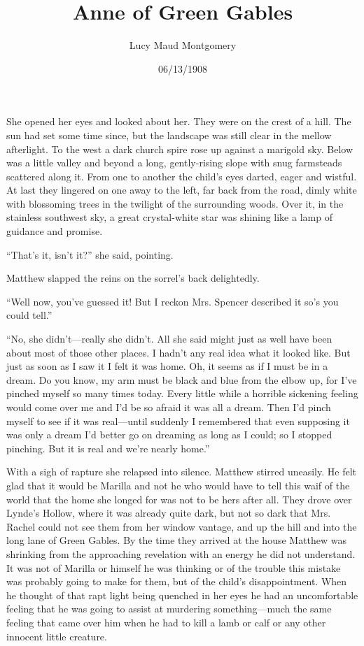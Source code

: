 \documentclass[a4paper]{article}
\title{Anne of Green Gables}
\author{Lucy Maud Montgomery}
\date{06/13/1908}
\begin{document}
\maketitle


{\sffamily She opened her eyes and looked about her. They were on the crest of a hill. The sun had set some time since, but the landscape was still clear in the mellow afterlight. To the west a dark church spire rose up against a marigold sky. Below was a little valley and beyond a long, gently-rising slope with snug farmsteads scattered along it. From one to another the child's eyes darted, eager and wistful. At last they lingered on one away to the left, far back from the road, dimly white with blossoming trees in the twilight of the surrounding woods. Over it, in the stainless southwest sky, a great crystal-white star was shining like a lamp of guidance and promise.

``That's it, isn't it?'' she said, pointing.

Matthew slapped the reins on the sorrel's back delightedly.

``Well now, you've guessed it! But I reckon Mrs. Spencer described it so's you could tell.''}

``No, she didn't---really she didn't. All she said might just as well have been about most of those other places. I hadn't any real idea what it looked like. But just as soon as I saw it I felt it was home. Oh, it seems as if I must be in a dream. Do you know, my arm must be black and blue from the elbow up, for I've pinched myself so many times today. Every little while a horrible sickening feeling would come over me and I'd be so afraid it was all a dream. Then I'd pinch myself to see if it was real---until suddenly I remembered that even supposing it was only a dream I'd better go on dreaming as long as I could; so I stopped pinching. But it is real and we're nearly home.''

With a sigh of rapture she relapsed into silence. Matthew stirred uneasily. He felt glad that it would be Marilla and not he who would have to tell this waif of the world that the home she longed for was not to be hers after all. They drove over Lynde's Hollow, where it was already quite dark, but not so dark that Mrs. Rachel could not see them from her window vantage, and up the hill and into the long lane of Green Gables. By the time they arrived at the house Matthew was shrinking from the approaching revelation with an energy he did not understand. It was not of Marilla or himself he was thinking or of the trouble this mistake was probably going to make for them, but of the child's disappointment. When he thought of that rapt light being quenched in her eyes he had an uncomfortable feeling that he was going to assist at murdering something---much the same feeling that came over him when he had to kill a lamb or calf or any other innocent little creature.
\end{document}
